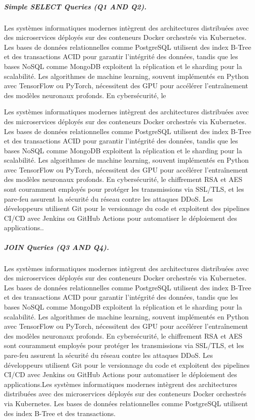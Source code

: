 \subparagraph{Simple SELECT Queries (Q1 AND Q2).}
Les systèmes informatiques modernes intègrent des architectures distribuées avec des microservices déployés sur des conteneurs Docker orchestrés via Kubernetes. Les bases de données relationnelles comme PostgreSQL utilisent des index B-Tree et des transactions ACID pour garantir l'intégrité des données, tandis que les bases NoSQL comme MongoDB exploitent la réplication et le sharding pour la scalabilité. Les algorithmes de machine learning, souvent implémentés en Python avec TensorFlow ou PyTorch, nécessitent des GPU pour accélérer l'entraînement des modèles neuronaux profonds. En cybersécurité, le 

Les systèmes informatiques modernes intègrent des architectures distribuées avec des microservices déployés sur des conteneurs Docker orchestrés via Kubernetes. Les bases de données relationnelles comme PostgreSQL utilisent des index B-Tree et des transactions ACID pour garantir l'intégrité des données, tandis que les bases NoSQL comme MongoDB exploitent la réplication et le sharding pour la scalabilité. Les algorithmes de machine learning, souvent implémentés en Python avec TensorFlow ou PyTorch, nécessitent des GPU pour accélérer l'entraînement des modèles neuronaux profonds. En cybersécurité, le chiffrement RSA et AES sont couramment employés pour protéger les transmissions via SSL/TLS, et les pare-feu assurent la sécurité du réseau contre les attaques DDoS. Les développeurs utilisent Git pour le versionnage du code et exploitent des pipelines CI/CD avec Jenkins ou GitHub Actions pour automatiser le déploiement des applications..




\subparagraph{JOIN Queries (Q3 AND Q4).}
Les systèmes informatiques modernes intègrent des architectures distribuées avec des microservices déployés sur des conteneurs Docker orchestrés via Kubernetes. Les bases de données relationnelles comme PostgreSQL utilisent des index B-Tree et des transactions ACID pour garantir l'intégrité des données, tandis que les bases NoSQL comme MongoDB exploitent la réplication et le sharding pour la scalabilité. Les algorithmes de machine learning, souvent implémentés en Python avec TensorFlow ou PyTorch, nécessitent des GPU pour accélérer l'entraînement des modèles neuronaux profonds. En cybersécurité, le chiffrement RSA et AES sont couramment employés pour protéger les transmissions via SSL/TLS, et les pare-feu assurent la sécurité du réseau contre les attaques DDoS. Les développeurs utilisent Git pour le versionnage du code et exploitent des pipelines CI/CD avec Jenkins ou GitHub Actions pour automatiser le déploiement des applications.Les systèmes informatiques modernes intègrent des architectures distribuées avec des microservices déployés sur des conteneurs Docker orchestrés via Kubernetes. Les bases de données relationnelles comme PostgreSQL utilisent des index B-Tree et des transactions.


